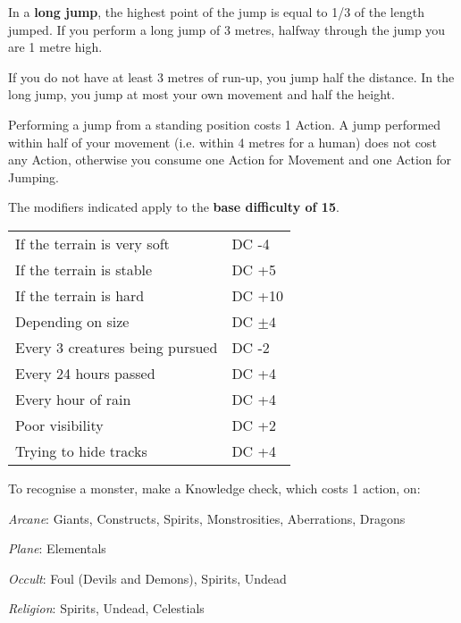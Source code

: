 \documentclass[landscape,10pt,a4paper]{article}
\begin{document}
\begin{multicols}{3}
\begin{dmbox}[title=Athletics - page \pageref{athletics}]
In a \textbf{long jump}, the highest point of the jump is equal to 1/3 of the length jumped. If you perform a long jump of 3 metres, halfway through the jump you are 1 metre high.

If you do not have at least 3 metres of run-up, you jump half the distance. In the long jump, you jump at most your own movement and half the height.

Performing a jump from a standing position costs 1 Action. A jump performed within half of your movement (i.e. within 4 metres for a human) does not cost any Action, otherwise you consume one Action for Movement and one Action for Jumping.
\end{dmbox}



\begin{dmbox}[title=Following Tracks - page \pageref{tracking}]
The modifiers indicated apply to the \textbf{base difficulty of 15}.\\

\noindent\begin{tabular}{ll}
If the terrain is very soft& DC -4\\
If the terrain is stable& DC +5\\
If the terrain is hard& DC +10\\
Depending on size& DC $\pm4$\\
Every 3 creatures being pursued& DC -2\\
Every 24 hours passed& DC +4\\
Every hour of rain& DC +4\\
Poor visibility& DC +2\\
Trying to hide tracks& DC +4\\
\end{tabular}
\end{dmbox}

\begin{dmbox}[title=Recognising monsters - page \pageref{recognisingmonsters}]

To recognise a monster, make a Knowledge check, which costs 1 action, on:

\medskip

\emph{Arcane}: Giants, Constructs, Spirits, Monstrosities, Aberrations, Dragons

\emph{Plane}: Elementals

\emph{Occult}: Foul (Devils and Demons), Spirits, Undead

\emph{Religion}: Spirits, Undead, Celestials


\end{dmbox}
\end{multicols}
\end{document}

